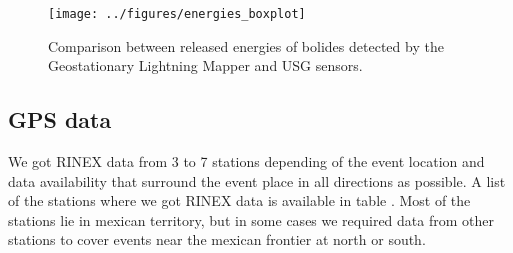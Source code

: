 \begin{figure}
  \centering
  \texttt{[image: ../figures/energies\_boxplot]}
  \caption{Comparison between released energies of bolides detected by the Geostationary Lightning Mapper and USG sensors.}
  \label{fig:boxplot}
\end{figure}


\subsection{GPS data}
\label{ssec:GPS}

We got RINEX data from 3 to 7 stations depending of the event location and data availability that surround the event place in all directions as possible. A list of the stations where we got RINEX data is available in table%
. Most of the stations lie in mexican territory, but in some cases we required data from other stations to cover events near the mexican frontier at north or south.

